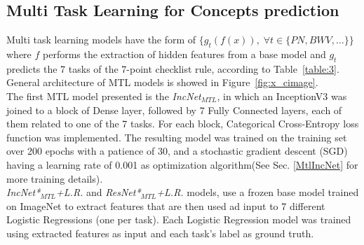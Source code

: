 \subsection{Multi Task Learning for Concepts prediction} \label{sectionMTL}
Multi task learning models have the form of $\{g_t(f(x)),\; \forall t \in \{ PN, BWV, \hdots \} \}$ where $f$ performs the extraction of hidden features from a base model and $g_t$ predicts the 7 tasks of the 7-point checklist rule, according to Table~\ref{table:3}. General architecture of MTL models is showed in Figure~\ref{fig:x_cimage}.\\ 
The first MTL model presented is the \emph{IncNet$_{MTL}$}, in which an InceptionV3 was joined to a block of Dense layer, followed by 7 Fully Connected layers, each of them related to one of the 7 tasks. For each block, Categorical Cross-Entropy loss function was implemented. The resulting model was trained on the training set over 200 epochs with a patience of 30, and a stochastic gradient descent (SGD) having a learning rate of 0.001 as optimization algorithm(See Sec. \ref{MtlIncNet} for more training details).\\
\emph{IncNet*$_{MTL}$+L.R.} and \emph{ResNet*$_{MTL}$+L.R.} models, use a frozen base model trained on ImageNet to extract features that are then used ad input to 7 different Logistic Regressions (one per task). Each  Logistic Regression model was trained using extracted features as input and each task's label as ground truth.
